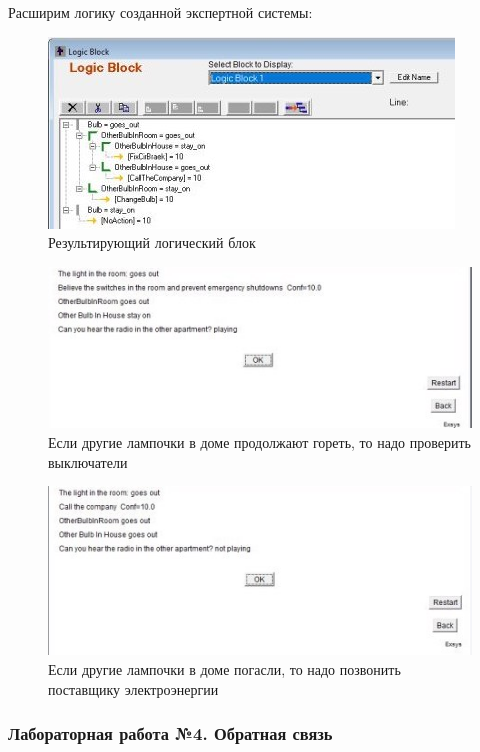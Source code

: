 \documentclass[14pt,a4paper,report]{report}
\begin{document}
Расширим логику созданной экспертной системы:

\begin{figure}[h!]
	\centering
	\includegraphics[scale = 0.85]{images/3_1.jpg}
	\caption{Результирующий логический блок}
\end{figure}



\begin{figure}[h!]

	\includegraphics[width=1\textwidth]{images/3_7.jpg}
	\caption{Если другие лампочки в доме продолжают гореть, то надо проверить выключатели}
\end{figure}

\begin{figure}[h!]
	\centering
	\includegraphics[scale = 1]{images/3_8.jpg}
	\caption{Если другие лампочки в доме погасли, то надо позвонить поставщику электроэнергии}
\end{figure}

\subsubsection{Лабораторная работа №4. Обратная связь}
\end{document}

